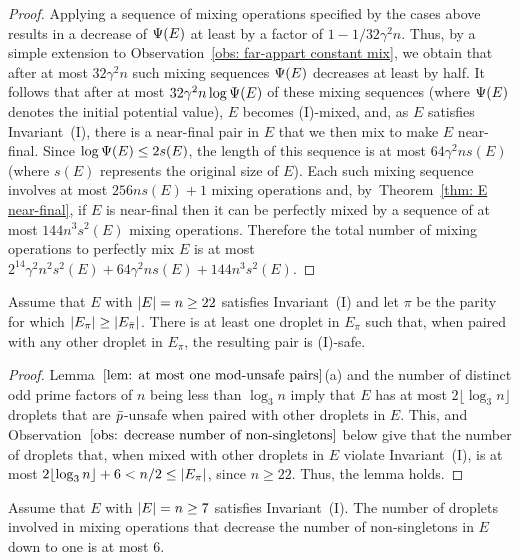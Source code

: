 \begin{proof}
	Applying a sequence of mixing operations specified by the cases above
	results in a decrease of ${\Psi}(E)$ at least by a factor of $1 - 1/32\gamma^2n$.
	Thus, by a simple extension to Observation~\ref{obs: far-appart constant mix},
	we obtain that after at most $32\gamma^2n$ such mixing sequences ${\Psi}(E)$ decreases at least by half.
	It follows that after at most $32\gamma^2n\log{\Psi}(E)$ of these mixing sequences (where ${\Psi}(E)$
	denotes the initial potential value), $E$ becomes (I)-mixed, and,
	as $E$ satisfies Invariant~(I), there is a near-final pair in $E$ that we then mix to make $E$ near-final.
	Since $\log{\Psi}(E)\le 2s(E)$, the length of this sequence is at most $64\gamma^2ns(E)$ (where $s(E)$ 
	represents the original size of $E$).
	Each such mixing sequence involves at most $256ns(E)+1$ mixing operations and,
	by~Theorem~\ref{thm: E near-final}, if $E$ is near-final then it can be perfectly mixed 
	by a sequence of at most $144n^3s^2(E)$	mixing operations. 
	Therefore the total number of mixing operations to perfectly mix $E$ is
	at most $2^{14}\gamma^2n^2s^2(E) + 64\gamma^2ns(E) + 144n^3s^2(E)$.
\end{proof}


\begin{observation}\label{obs: number of same-parity unsafe pairs}
	Assume that $E$ with ${|E|}=n\geq 22$ satisfies Invariant~(I)
	and let $\pi$ be the parity for which ${|E_{\pi}|}\geq{|E_{\bar{\pi}}|}$.
	There is at least one droplet in $E_{\pi}$ such that, when paired with any other
	droplet in $E_{\pi}$, the resulting pair is (I)-safe.
\end{observation}

\begin{proof}
	Lemma~$\ref{lem: at most one mod-unsafe pairs}$(a) and the number of distinct odd 
	prime factors of $n$ being less than $\log_3{n}$ imply that $E$ has at most
	$2\lfloor\log_3{n}\rfloor$ droplets that are ${\bar{p}}$-unsafe when paired with other droplets in $E$.
	This, and Observation~$\ref{obs: decrease number of non-singletons}$ below
	give that the number of droplets that, when mixed with other droplets in $E$
	violate Invariant~(I), is at most 
	$2\lfloor\log_3{n}\rfloor+6< n/2\leq{|E_{\pi}|}$, since $n\geq22$.
	Thus, the lemma holds.
\end{proof}

\begin{observation}\label{obs: decrease number of non-singletons}
Assume that $E$ with ${|E|}=n\geq 7$ satisfies Invariant~(I).
The number of droplets involved in mixing operations that decrease the number of
non-singletons in $E$ down to one is at most $6$.
\end{observation}

